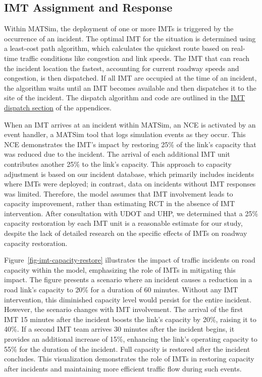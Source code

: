 \documentclass[fancy, oneside, mastersfancy, ms]{byuthesis}
\begin{document}
\hypertarget{sec-imt_response}{%
\subsection{IMT Assignment and Response}\label{sec-imt_response}}

Within MATSim, the deployment of one or more IMTs is triggered by the
occurrence of an incident. The optimal IMT for the situation is
determined using a least-cost path algorithm, which calculates the
quickest route based on real-time traffic conditions like congestion and
link speeds. The IMT that can reach the incident location the fastest,
accounting for current roadway speeds and congestion, is then
dispatched. If all IMT are occupied at the time of an incident, the
algorithm waits until an IMT becomes available and then dispatches it to
the site of the incident. The dispatch algorithm and code are outlined
in the \protect\hyperlink{sec-imt_dispatch}{IMT dispatch section} of the
appendices.

When an IMT arrives at an incident within MATSim, an NCE is activated by
an event handler, a MATSim tool that logs simulation events as they
occur. This NCE demonstrates the IMT's impact by restoring 25\% of the
link's capacity that was reduced due to the incident. The arrival of
each additional IMT unit contributes another 25\% to the link's
capacity. This approach to capacity adjustment is based on our incident
database, which primarily includes incidents where IMTs were deployed;
in contrast, data on incidents without IMT responses was limited.
Therefore, the model assumes that IMT involvement leads to capacity
improvement, rather than estimating RCT in the absence of IMT
intervention. After consultation with UDOT and UHP, we determined that a
25\% capacity restoration by each IMT unit is a reasonable estimate for
our study, despite the lack of detailed research on the specific effects
of IMTs on roadway capacity restoration.

Figure~\ref{fig-imt-capacity-restore} illustrates the impact of traffic
incidents on road capacity within the model, emphasizing the role of
IMTs in mitigating this impact. The figure presents a scenario where an
incident causes a reduction in a road link's capacity to 20\% for a
duration of 60 minutes. Without any IMT intervention, this diminished
capacity level would persist for the entire incident. However, the
scenario changes with IMT involvement. The arrival of the first IMT 15
minutes after the incident boosts the link's capacity by 20\%, raising
it to 40\%. If a second IMT team arrives 30 minutes after the incident
begins, it provides an additional increase of 15\%, enhancing the link's
operating capacity to 55\% for the duration of the incident. Full
capacity is restored after the incident concludes. This visualization
demonstrates the role of IMTs in restoring capacity after incidents and
maintaining more efficient traffic flow during such events.
\end{document}
